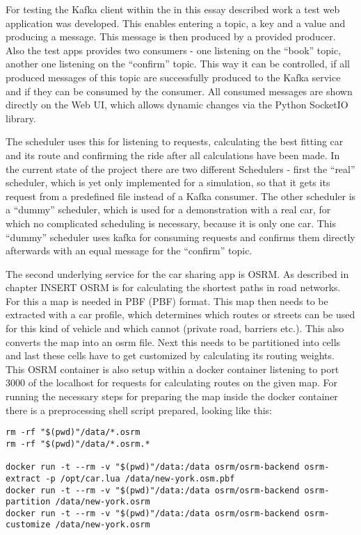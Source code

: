 For testing the Kafka client within the in this essay described work a test web application was developed. This enables entering a topic, a key and a value and producing a message. This message is then produced by a provided producer.  Also the test apps provides two consumers - one listening on the ``book'' topic, another one listening on the ``confirm'' topic. This way it can be controlled, if all produced messages of this topic are successfully produced to the Kafka service and if they can be consumed by the consumer. All consumed messages are shown directly on the Web UI, which allows dynamic changes via the Python SocketIO library.

The scheduler uses this for listening to requests, calculating the best fitting car and its route and confirming the ride after all calculations have been made. In the current state of the project there are two different Schedulers - first the ``real'' scheduler, which is yet only implemented for a simulation, so that it gets its request from a predefined file instead of a Kafka consumer. The other scheduler is a ``dummy'' scheduler, which is used for a demonstration with a real car, for which no complicated scheduling is necessary, because it is only one car. This ``dummy'' scheduler uses kafka for consuming requests and confirms them directly afterwards with an equal message for the ``confirm'' topic.


The second underlying service for the car sharing app is OSRM. As described in chapter INSERT OSRM is for calculating the shortest paths in road networks. For this a map is needed in \acs{PBF} (\acl{PBF}) format. This map then needs to be extracted with a car profile, which determines which routes or streets can be used for this kind of vehicle and which cannot (private road, barriers etc.). This also converts the map into an osrm file. Next this needs to be partitioned into cells and last these cells have to get customized by calculating its routing weights. This OSRM container is also setup within a docker container listening to port 3000 of the localhost for requests for calculating routes on the given map. For running the necessary steps for preparing the map inside the docker container there is a preprocessing shell script prepared, looking like this:


\begin{lstlisting}
rm -rf "$(pwd)"/data/*.osrm
rm -rf "$(pwd)"/data/*.osrm.*

docker run -t --rm -v "$(pwd)"/data:/data osrm/osrm-backend osrm-extract -p /opt/car.lua /data/new-york.osm.pbf
docker run -t --rm -v "$(pwd)"/data:/data osrm/osrm-backend osrm-partition /data/new-york.osrm
docker run -t --rm -v "$(pwd)"/data:/data osrm/osrm-backend osrm-customize /data/new-york.osrm
\end{lstlisting}

